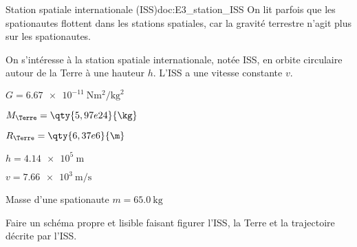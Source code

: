 
\begin{doc}{Station spatiale internationale (ISS)}{doc:E3_station_ISS}
  On lit parfois que les spationautes flottent dans les stations spatiales, car la gravité terrestre n'agit plus sur les spationautes.
  
  \begin{wrapfigure}{r}{0.4\linewidth}
    \vspace*{-30pt}
    \centering
  \end{wrapfigure}
  
  On s'intéresse à la station spatiale internationale, notée ISS, en orbite circulaire autour de la Terre à une hauteur $h$.
  L'ISS a une vitesse constante $v$.

  \begin{listePoints}
    \item $G = \qty{6,67e-11}{\newton\m\squared \per\kg\squared}$
    \item $M_\Terre = \qty{5,97e24}{\kg}$
    \item $R_\Terre = \qty{6,37e6}{\m}$
    \item $h = \qty{4,14e5}{\m}$
    \item $v = \qty{7,66e3}{\m\per\s}$
    \item Masse d'une spationaute $m = \qty{65,0}{\kg}$
  \end{listePoints}
\end{doc}


\numeroQuestion
  \label{exo:schema_ISS}
  Faire un schéma propre et lisible faisant figurer l'ISS, la Terre et la trajectoire décrite par l'ISS.


